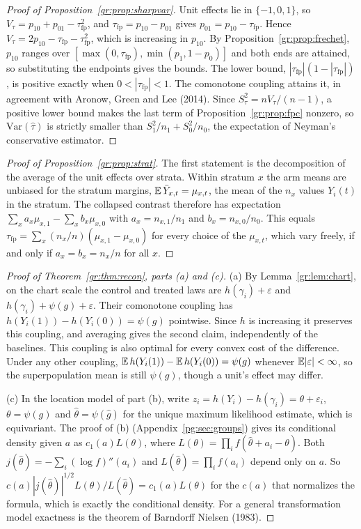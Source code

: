 \begin{proof}[Proof of Proposition~\ref{gr:prop:sharpvar}]
Unit effects lie in $\{-1,0,1\}$, so $V_\tau=p_{10}+p_{01}-\tau_{\mathrm{fp}}^2$, and $\tau_{\mathrm{fp}}=p_{10}-p_{01}$ gives $p_{01}=p_{10}-\tau_{\mathrm{fp}}$. Hence $V_\tau=2p_{10}-\tau_{\mathrm{fp}}-\tau_{\mathrm{fp}}^2$, which is increasing in $p_{10}$. By Proposition~\ref{gr:prop:frechet}, $p_{10}$ ranges over $[\max(0,\tau_{\mathrm{fp}}),\min(p_1,1-p_0)]$ and both ends are attained, so substituting the endpoints gives the bounds. The lower bound, $|\tau_{\mathrm{fp}}|(1-|\tau_{\mathrm{fp}}|)$, is positive exactly when $0<|\tau_{\mathrm{fp}}|<1$. The comonotone coupling attains it, in agreement with Aronow, Green and Lee (2014). Since $S_\tau^2=nV_\tau/(n-1)$, a positive lower bound makes the last term of Proposition~\ref{gr:prop:fpc} nonzero, so $\mathrm{Var}(\hat\tau)$ is strictly smaller than $S_1^2/n_1+S_0^2/n_0$, the expectation of Neyman's conservative estimator.
\end{proof}

\begin{proof}[Proof of Proposition~\ref{gr:prop:strat}]
The first statement is the decomposition of the average of the unit effects over strata. Within stratum $x$ the arm means are unbiased for the stratum margins, $\mathbb{E}\,\bar Y_{x,t}=\mu_{x,t}$, the mean of the $n_x$ values $Y_i(t)$ in the stratum. The collapsed contrast therefore has expectation $\sum_xa_x\mu_{x,1}-\sum_xb_x\mu_{x,0}$ with $a_x=n_{x,1}/n_1$ and $b_x=n_{x,0}/n_0$. This equals $\tau_{\mathrm{fp}}=\sum_x(n_x/n)(\mu_{x,1}-\mu_{x,0})$ for every choice of the $\mu_{x,t}$, which vary freely, if and only if $a_x=b_x=n_x/n$ for all $x$.
\end{proof}

\begin{proof}[Proof of Theorem~\ref{gr:thm:recon}, parts (a) and (c)]
(a) By Lemma~\ref{gr:lem:chart}, on the chart scale the control and treated laws are $h(\gamma_i)+\varepsilon$ and $h(\gamma_i)+\psi(g)+\varepsilon$. Their comonotone coupling has $h(Y_i(1))-h(Y_i(0))=\psi(g)$ pointwise. Since $h$ is increasing it preserves this coupling, and averaging gives the second claim, independently of the baselines. This coupling is also optimal for every convex cost of the difference. Under any other coupling, $\mathbb{E}\,h(Y_i(1))-\mathbb{E}\,h(Y_i(0))=\psi(g)$ whenever $\mathbb{E}|\varepsilon|<\infty$, so the superpopulation mean is still $\psi(g)$, though a unit's effect may differ.

(c) In the location model of part (b), write $z_i=h(Y_i)-h(\gamma_i)=\theta+\varepsilon_i$, $\theta=\psi(g)$ and $\hat\theta=\psi(\hat g)$ for the unique maximum likelihood estimate, which is equivariant. The proof of (b) (Appendix~\ref{pg:sec:groups}) gives its conditional density given $a$ as $c_1(a)L(\theta)$, where $L(\theta)=\prod_i f(\hat\theta+a_i-\theta)$. Both $j(\hat\theta)=-\sum_i(\log f)''(a_i)$ and $L(\hat\theta)=\prod_i f(a_i)$ depend only on $a$. So $c(a)|j(\hat\theta)|^{1/2}L(\theta)/L(\hat\theta)=c_1(a)L(\theta)$ for the $c(a)$ that normalizes the formula, which is exactly the conditional density. For a general transformation model exactness is the theorem of Barndorff Nielsen (1983).
\end{proof}

